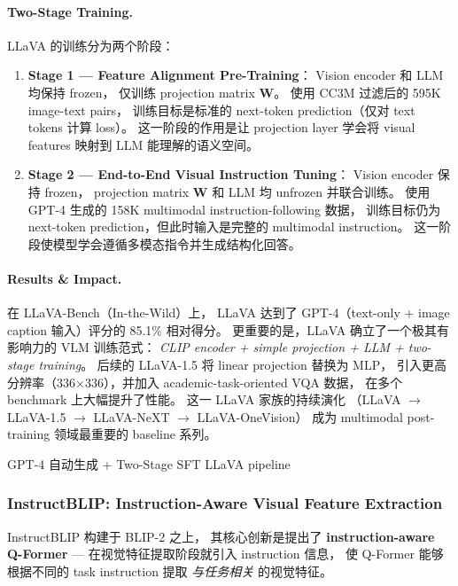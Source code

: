 \paragraph{Two-Stage Training.}
LLaVA 的训练分为两个阶段：

\begin{enumerate}[leftmargin=2em]
  \item \textbf{Stage 1 --- Feature Alignment Pre-Training}：
    Vision encoder 和 LLM 均保持 frozen，
    仅训练 projection matrix $\mathbf{W}$。
    使用 CC3M 过滤后的 595K image-text pairs，
    训练目标是标准的 next-token prediction（仅对 text tokens 计算 loss）。
    这一阶段的作用是让 projection layer 学会将 visual features 映射到 LLM 能理解的语义空间。

  \item \textbf{Stage 2 --- End-to-End Visual Instruction Tuning}：
    Vision encoder 保持 frozen，
    projection matrix $\mathbf{W}$ 和 LLM 均 unfrozen 并联合训练。
    使用 GPT-4 生成的 158K multimodal instruction-following 数据，
    训练目标仍为 next-token prediction，但此时输入是完整的 multimodal instruction。
    这一阶段使模型学会遵循多模态指令并生成结构化回答。
\end{enumerate}

\paragraph{Results \& Impact.}
在 LLaVA-Bench（In-the-Wild）上，
LLaVA 达到了 GPT-4（text-only + image caption 输入）评分的 85.1\% 相对得分。
更重要的是，LLaVA 确立了一个极其有影响力的 VLM 训练范式：
\textit{CLIP encoder + simple projection + LLM + two-stage training}。
后续的 LLaVA-1.5 \cite{liu2023llava15} 将 linear projection 替换为 MLP，
引入更高分辨率（336$\times$336），并加入 academic-task-oriented VQA 数据，
在多个 benchmark 上大幅提升了性能。
这一 LLaVA 家族的持续演化
（LLaVA $\rightarrow$ LLaVA-1.5 $\rightarrow$ LLaVA-NeXT $\rightarrow$ LLaVA-OneVision）
成为 multimodal post-training 领域最重要的 baseline 系列。

  {GPT-4 自动生成 + Two-Stage SFT}
  {LLaVA pipeline}

\subsubsection{InstructBLIP: Instruction-Aware Visual Feature Extraction}
\label{sec:t5-instructblip}

InstructBLIP \cite{dai2023instructblip} 构建于 BLIP-2 \cite{li2023blip2} 之上，
其核心创新是提出了 \textbf{instruction-aware Q-Former} ---
在视觉特征提取阶段就引入 instruction 信息，
使 Q-Former 能够根据不同的 task instruction 提取 \textit{与任务相关} 的视觉特征。

